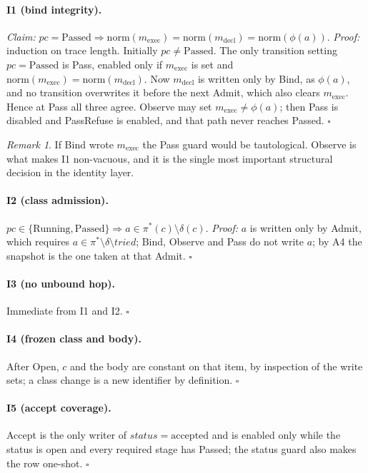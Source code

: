 \documentclass[11pt,a4paper]{article}
\theoremstyle{plain}
\theoremstyle{definition}
\theoremstyle{remark}
\newtheorem*{remark}{Remark}
\newcommand{\norm}{\ensuremath{\mathrm{norm}}}
\begin{document}
\paragraph{I1 (bind integrity).} \emph{Claim:} $\mathit{pc}=\mathrm{Passed} \Rightarrow \norm(m_{\mathrm{exec}})=\norm(m_{\mathrm{decl}})=\norm(\phi(a))$. \emph{Proof:} induction on trace length. Initially $\mathit{pc}\neq\mathrm{Passed}$. The only transition setting $\mathit{pc}=\mathrm{Passed}$ is Pass, enabled only if $m_{\mathrm{exec}}$ is set and $\norm(m_{\mathrm{exec}})=\norm(m_{\mathrm{decl}})$. Now $m_{\mathrm{decl}}$ is written only by Bind, as $\phi(a)$, and no transition overwrites it before the next Admit, which also clears $m_{\mathrm{exec}}$. Hence at Pass all three agree. Observe may set $m_{\mathrm{exec}} \neq \phi(a)$; then Pass is disabled and PassRefuse is enabled, and that path never reaches Passed. $\square$

\begin{remark}
If Bind wrote $m_{\mathrm{exec}}$ the Pass guard would be tautological. Observe is what makes I1 non-vacuous, and it is the single most important structural decision in the identity layer.
\end{remark}

\paragraph{I2 (class admission).} $\mathit{pc}\in\{\mathrm{Running},\mathrm{Passed}\} \Rightarrow a \in \pi^{*}(c)\setminus\delta(c)$. \emph{Proof:} $a$ is written only by Admit, which requires $a \in \pi^{*}\setminus\delta\setminus\mathit{tried}$; Bind, Observe and Pass do not write $a$; by A4 the snapshot is the one taken at that Admit. $\square$

\paragraph{I3 (no unbound hop).} Immediate from I1 and I2. $\square$

\paragraph{I4 (frozen class and body).} After Open, $c$ and the body are constant on that item, by inspection of the write sets; a class change is a new identifier by definition. $\square$

\paragraph{I5 (accept coverage).} Accept is the only writer of $\mathit{status}=\mathrm{accepted}$ and is enabled only while the status is open and every required stage has Passed; the status guard also makes the row one-shot. $\square$
\end{document}
